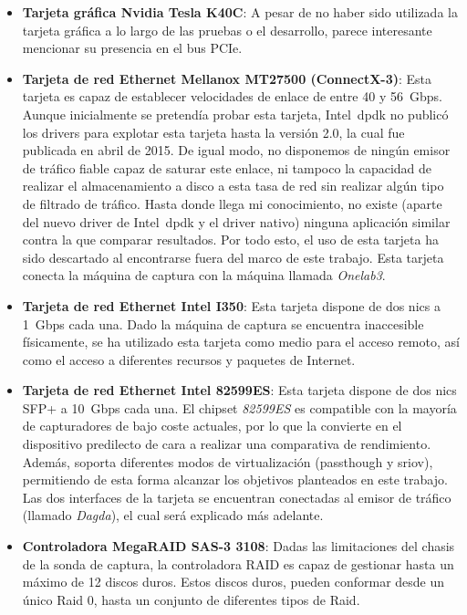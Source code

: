 \begin{itemize}
\item \textbf{Tarjeta gráfica Nvidia Tesla K40C}: A pesar de no haber sido utilizada la tarjeta gráfica a lo largo de las pruebas o el desarrollo, parece interesante mencionar su presencia en el bus PCIe.

\item \textbf{Tarjeta de red Ethernet Mellanox MT27500 (ConnectX-3)}: Esta tarjeta es capaz de establecer velocidades de enlace de entre 40 y 56~Gbps. Aunque inicialmente se pretendía probar esta tarjeta, Intel~\gls{dpdk} no publicó los drivers para explotar esta tarjeta hasta la versión 2.0, la cual fue publicada en abril de 2015. De igual modo, no disponemos de ningún emisor de tráfico fiable capaz de saturar este enlace, ni tampoco la capacidad de realizar el almacenamiento a disco a esta tasa de red sin realizar algún tipo de filtrado de tráfico. Hasta donde llega mi conocimiento, no existe (aparte del nuevo driver de Intel~\gls{dpdk} y el driver nativo) ninguna aplicación similar contra la que comparar resultados. Por todo esto, el uso de esta tarjeta ha sido descartado al encontrarse fuera del marco de este trabajo. Esta tarjeta conecta la máquina de captura con la máquina llamada \textit{Onelab3}.

\item \textbf{Tarjeta de red Ethernet Intel I350}: Esta tarjeta dispone de dos \glspl{nic} a 1~Gbps cada una. Dado la máquina de captura se encuentra inaccesible físicamente, se ha utilizado esta tarjeta como medio para el acceso remoto, así como el acceso a diferentes recursos y paquetes de Internet.

\item \textbf{Tarjeta de red Ethernet Intel 82599ES}: Esta tarjeta dispone de dos \glspl{nic} SFP+ a 10~Gbps cada una. El chipset \textit{82599ES} es compatible con la mayoría de capturadores de bajo coste actuales, por lo que la convierte en el dispositivo predilecto de cara a realizar una comparativa de rendimiento. Además, soporta diferentes modos de virtualización (\gls{passthough} y \gls{sriov}), permitiendo de esta forma alcanzar los objetivos planteados en este trabajo. Las dos interfaces de la tarjeta se encuentran conectadas al emisor de tráfico (llamado \textit{Dagda}), el cual será explicado más adelante.

\item \textbf{Controladora MegaRAID SAS-3 3108}: Dadas las limitaciones del chasis de la sonda de captura, la controladora RAID es capaz de gestionar hasta un máximo de 12 discos duros. Estos discos duros, pueden conformar desde un único Raid 0, hasta un conjunto de diferentes tipos de Raid. 
\end{itemize}

